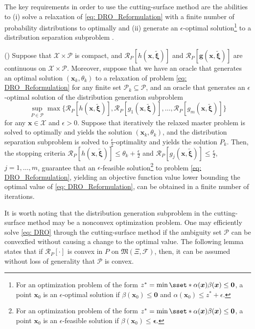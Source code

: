 \documentclass[final,onefignum,onetabnum]{class}
\newcommand{\rrisk}[2]{\Cs{R}_{#1} \left[ #2 \right]}
\newcommand{\bs}[1]{\boldsymbol{#1}} %
\newcommand{\Cs}[1]{\mathcal{#1}} %
\newcommand{\Fs}[1]{\mathfrak{#1}} %
\newcommand{\txi}{\tilde{\bs{\xi}}}
\newcommand{\measurespace}{\left( \Xi, \Cs{F} \right)}
\begin{document}
The key requirements in order to use the cutting-surface method are the abilities to (i) solve a relaxation of \eqref{eq: DRO_Reformulation} with a finite number of probability distributions to optimally and (ii)  generate an $\epsilon$-optimal solution\footnote{For an optimization problem of the form $z^{*}=\min\sset*{\alpha(\bs{x})}{\beta(\bs{x}) \le \bs{0}}$, a point $\bs{x}_{0}$ is an $\epsilon$-optimal solution if $\beta(\bs{x}_{0}) \le \bs{0}$ and $\alpha(\bs{x}_{0}) \le z^{*}+ \epsilon$.} to a distribution separation subproblem \cite{luo2019}. 
\begin{theorem}{(\citet[Theorem~3.2]{luo2019})}
    \label{thm: SIP}
    Suppose that $\Cs{X}  \times \Cs{P} $ is compact, and  $\rrisk{P}{h(\bs{x},\txi)}$ and $\rrisk{P}{\bs{g}(\bs{x},\txi)}$ are continuous on $\Cs{X}  \times \Cs{P}$. Moreover, suppose that we have an oracle that generates an optimal solution $(\bs{x}_{k}, \theta_{k})$ to a relaxation of problem \eqref{eq: DRO_Reformulation} for any finite set $\Cs{P}_{k} \subseteq \Cs{P}$, and an oracle that generates an $\epsilon$-optimal solution of the distribution generation subproblem $$ \sup_{P \in \Cs{P}} \max\Bigg\{\rrisk{P}{h(\bs{x},\txi)}, \rrisk{P}{g_{1}(\bs{x},\txi)}, \ldots, \rrisk{P}{g_{m}(\bs{x},\txi)}\Bigg\}$$ for any $\bs{x} \in \Cs{X}$ and $\epsilon>0$. Suppose that iteratively  the relaxed master problem is solved to optimally and yields the solution $(\bs{x}_{k}, \theta_{k})$, and  the distribution separation subproblem is solved to $\frac{\epsilon}{2}$-optimality and yields the solution $P_{k}$. Then, the stopping criteria  $\rrisk{P}{h(\bs{x},\txi)} \le \theta_{k} + \frac{\epsilon}{2}$ and $\rrisk{P}{g_{j}(\bs{x},\txi)} \le  \frac{\epsilon}{2}$, $j=1, \ldots, m$, guarantee that  an $\epsilon$-feasible solution\footnote{For an optimization problem of the form $z^{*}=\min\sset*{\alpha(\bs{x})}{\beta(\bs{x}) \le \bs{0}}$, a point $\bs{x}_{0}$ is an $\epsilon$-feasible solution if $\beta(\bs{x}_{0}) \le \bs{\epsilon}$.} to problem \eqref{eq: DRO_Reformulation}, yielding an objective function value lower bounding the optimal value of \eqref{eq: DRO_Reformulation}, can be obtained in a finite number of iterations. 
\end{theorem}

It is worth noting that the distribution generation subproblem in the cutting-surface method may be a nonconvex optimization problem. One may efficiently solve \eqref{eq: DRO}  through the  cutting-surface method if the ambiguity set $\Cs{P}$ can be convexfied without causing a change to the optimal value. The following lemma states that if $\rrisk{P}{\cdot}$ is convex in $P$ on $\Fs{M}\measurespace$, then, it can be assumed  without loss of generality that $\Cs{P}$ is convex. 
\end{document}
